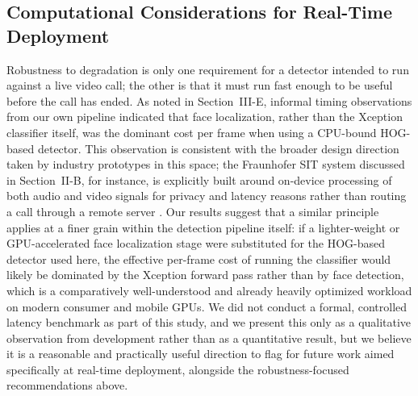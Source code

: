 \documentclass[conference]{IEEEtran}
\begin{document}
\subsection{Computational Considerations for Real-Time Deployment}
Robustness to degradation is only one requirement for a detector intended to run against a live video call; the other is that it must run fast enough to be useful before the call has ended. As noted in Section~III-E, informal timing observations from our own pipeline indicated that face localization, rather than the Xception classifier itself, was the dominant cost per frame when using a CPU-bound HOG-based detector. This observation is consistent with the broader design direction taken by industry prototypes in this space; the Fraunhofer SIT system discussed in Section~II-B, for instance, is explicitly built around on-device processing of both audio and video signals for privacy and latency reasons rather than routing a call through a remote server \cite{fraunhofer2026}. Our results suggest that a similar principle applies at a finer grain within the detection pipeline itself: if a lighter-weight or GPU-accelerated face localization stage were substituted for the HOG-based detector used here, the effective per-frame cost of running the classifier would likely be dominated by the Xception forward pass rather than by face detection, which is a comparatively well-understood and already heavily optimized workload on modern consumer and mobile GPUs. We did not conduct a formal, controlled latency benchmark as part of this study, and we present this only as a qualitative observation from development rather than as a quantitative result, but we believe it is a reasonable and practically useful direction to flag for future work aimed specifically at real-time deployment, alongside the robustness-focused recommendations above.
\end{document}
